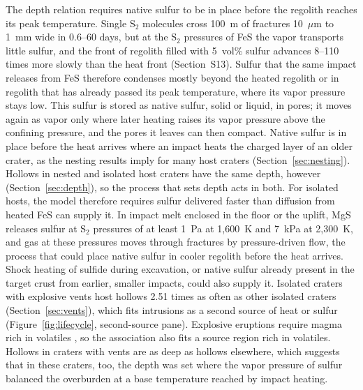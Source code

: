 \documentclass[article,review]{planetary}
\begin{document}
The depth relation requires native sulfur to be in place before the regolith reaches its peak temperature. Single S$_2$ molecules cross 100~m of fractures 10~$\mu$m to 1~mm wide in 0.6--60 days, but at the S$_2$ pressures of FeS the vapor transports little sulfur, and the front of regolith filled with 5~vol\% sulfur advances 8--110 times more slowly than the heat front (Section~S13). Sulfur that the same impact releases from FeS therefore condenses mostly beyond the heated regolith or in regolith that has already passed its peak temperature, where its vapor pressure stays low. This sulfur is stored as native sulfur, solid or liquid, in pores; it moves again as vapor only where later heating raises its vapor pressure above the confining pressure, and the pores it leaves can then compact. Native sulfur is in place before the heat arrives where an impact heats the charged layer of an older crater, as the nesting results imply for many host craters (Section~\ref{sec:nesting}). Hollows in nested and isolated host craters have the same depth, however (Section~\ref{sec:depth}), so the process that sets depth acts in both. For isolated hosts, the model therefore requires sulfur delivered faster than diffusion from heated FeS can supply it. In impact melt enclosed in the floor or the uplift, MgS releases sulfur at S$_2$ pressures of at least 1~Pa at 1,600~K and 7~kPa at 2,300~K, and gas at these pressures moves through fractures by pressure-driven flow, the process that could place native sulfur in cooler regolith before the heat arrives. Shock heating of sulfide during excavation, or native sulfur already present in the target crust from earlier, smaller impacts, could also supply it. Isolated craters with explosive vents host hollows 2.51 times as often as other isolated craters (Section~\ref{sec:vents}), which fits intrusions as a second source of heat or sulfur (Figure~\ref{fig:lifecycle}, second-source pane). Explosive eruptions require magma rich in volatiles \parencite{kerber2011}, so the association also fits a source region rich in volatiles. Hollows in craters with vents are as deep as hollows elsewhere, which suggests that in these craters, too, the depth was set where the vapor pressure of sulfur balanced the overburden at a base temperature reached by impact heating.
\end{document}
